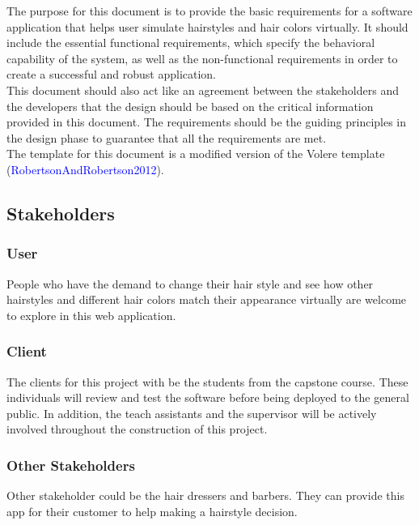 \documentclass[12pt]{article}
\begin{document}
The purpose for this document is to provide the basic requirements for a software application that helps user simulate hairstyles and hair colors virtually. It should include the essential functional requirements, which specify the behavioral capability of the system, as well as the non-functional requirements in order to create a successful and robust application. \\
\newline
\noindent
This document should also act like an agreement between the stakeholders and the developers that the design should be based on the critical information provided in this document. The requirements should be the guiding principles in the design phase to guarantee that all the requirements are met. \\
\newline
The template for this document is a modified version 
of the Volere template (\textcolor{blue}{RobertsonAndRobertson2012}).

\subsection{Stakeholders}
\subsubsection{User}
\item People who have the demand to change their hair style and see how other hairstyles and different hair colors match their appearance virtually are welcome to explore in this web application.

\subsubsection{Client}

The clients for this project with be the students from the capstone course. These individuals will review and test the software before being deployed to the general public. In addition, the teach assistants and the supervisor will be actively involved throughout
the construction of this project.

\subsubsection{Other Stakeholders}
Other stakeholder could be the hair dressers and barbers. They can provide this app for their customer to help making a hairstyle decision.
\end{document}
